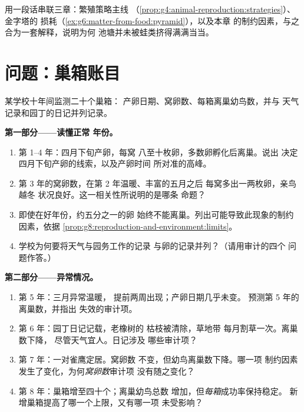 \begin{exercise}[$\star\star\star$]\label{exo:g8:reproduction-and-environment:12}
用一段话串联三章：繁殖策略主线
（\cref{prop:g4:animal-reproduction:strategies}）、金字塔的
损耗（\cref{ex:g6:matter-from-food:pyramid}），以及本章
的制约因素，与之合为一套解释，说明为何
池塘并未被蛙类挤得满满当当。
\end{exercise}

\section{问题：巢箱账目}

\begin{problem}\label{pb:g8:reproduction-and-environment:1}
某学校十年间监测二十个巢箱：
产卵日期、窝卵数、每箱离巢幼鸟数，并与
天气记录和园丁的日记并列记录。

\medskip\noindent\textbf{第一部分——读懂正常
年份。}
\begin{enumerate}
  \item 第 1--4 年：四月下旬产卵，每窝
        八至十枚卵，多数卵孵化后离巢。说出
        决定四月下旬产卵的线索，以及产卵时间
        所对准的高峰。
  \item 第 3 年的窝卵数，在第 2 年温暖、丰富的五月之后
        每窝多出一两枚卵，亲鸟越冬
        状况良好。这一相关性所说明的是哪条
        命题？
  \item 即使在好年份，约五分之一的卵
        始终不能离巢。列出可能导致此现象的制约因素，依据
        \cref{prop:g8:reproduction-and-environment:limits}。
  \item 学校为何要将天气与园务工作的记录
        与卵的记录并列？（请用审计的四个
        问题作答。）
\end{enumerate}

\medskip\noindent\textbf{第二部分——异常情况。}
\begin{enumerate}[resume]
  \item 第 5 年：三月异常温暖，
        提前两周出现；产卵日期几乎未变。
        预测第 5 年的离巢数，并指出
        失效的审计项。
  \item 第 6 年：园丁日记记载，老橡树的
        枯枝被清除，草地带
        每月割草一次。离巢数下降，
        尽管天气宜人。日记涉及
        哪些审计项？
  \item 第 7 年：一对雀鹰定居。窝卵数
        不变，但幼鸟离巢数下降。哪一项
        制约因素发生了变化，为何\emph{窝卵数}审计项
        没有随之变化？
  \item 第 8 年：巢箱增至四十个；离巢幼鸟总数
        增加，但\emph{每箱}成功率保持稳定。
        新增巢箱提高了哪一个上限，又有哪一项
        未受影响？
\end{enumerate}


\end{problem}
